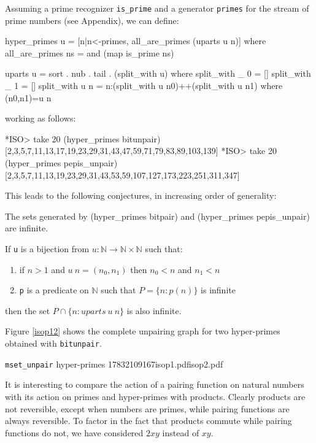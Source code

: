 \documentclass[]{INCLUDES/llncs}
\begin{document}
Assuming a prime recognizer {\tt is\_prime} and a generator {\tt primes} 
for the stream of prime numbers (see Appendix), we can define:
\begin{code}
hyper_primes u = [n|n<-primes, all_are_primes (uparts u n)] where
  all_are_primes ns = and (map is_prime ns)
  
uparts u = sort . nub . tail . (split_with u) where
    split_with _ 0 = []
    split_with _ 1 = []
    split_with u n = n:(split_with u n0)++(split_with u n1) where
      (n0,n1)=u n  
\end{code}
working as follows:
\begin{codex}
*ISO> take 20 (hyper_primes bitunpair)
[2,3,5,7,11,13,17,19,23,29,31,43,47,59,71,79,83,89,103,139]
*ISO> take 20 (hyper_primes pepis_unpair)
[2,3,5,7,11,13,19,23,29,31,43,53,59,107,127,173,223,251,311,347]
\end{codex}
This leads to the following conjectures, in increasing order of
generality:
\begin{conj}
The sets generated by (hyper\_primes bitpair) and (hyper\_primes pepis\_unpair)
are infinite.
\end{conj}

\begin{conj}
If {\tt u} is a bijection from  $u:\mathbb{N} \rightarrow \mathbb{N} \times \mathbb{N}$ such that:
\begin{enumerate}
\item if $n>1$ and $u~n = (n_0,n_1)$ then $n_0 < n$ and $n_1<n$
\item  {\tt p} is a
predicate on $\mathbb{N}$ such that $P=\{n:p(n)\}$ is infinite
\end{enumerate}
then the set $P \cap \{n : {uparts}~u~n\}$ is also infinite.
\end{conj}

Figure \ref{isop12} %
shows the complete unpairing graph for two
hyper-primes obtained with {\tt bitunpair}.


{{\tt mset\_unpair} hyper-primes}
{1783}{2109167}{isop1.pdf}{isop2.pdf}

It is interesting to compare the action of a pairing function on natural
numbers with its action on primes and
hyper-primes with products. Clearly products are not reversible, except when numbers are primes,
while pairing functions are always reversible. To factor in the fact that
products commute while pairing functions do not, we have considered $2xy$
instead of $xy$.
\end{document}

